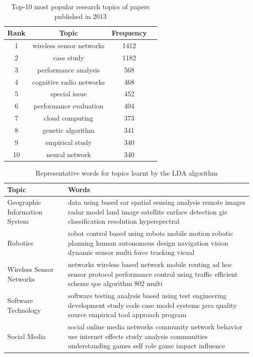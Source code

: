 \documentclass{sig-alternate-05-2015}
\begin{document}
\begin{table}[th]
\centering
\caption{Top-10 most popular research topics of papers published in 2013} \label{tbl:poptop}
\begin{tabular}{cccc}
\hline
Rank & Topic & Frequency\\ 
\hline
1 & wireless sensor networks & 1412 \\
2 & case study & 1182 \\
3 & performance analysis & 568 \\
4 & cognitive radio networks & 468 \\
5 & special issue & 452 \\
6 & performance evaluation & 404 \\
7 & cloud computing & 373 \\
8 & genetic algorithm & 341 \\
9 & empirical study & 340 \\
10 & neural network & 340 \\
\hline
\end{tabular}
\end{table}

\begin{table}[th]\small
\centering
\caption{Representative words for topics learnt by the LDA algorithm} \label{tbl:topics}
\begin{tabular}{p{65pt}p{180pt}}
\hline
Topic & Words\\
\hline
Geographic Information System & data using based sar spatial sensing analysis remote images radar model land image satellite surface detection gis classification resolution hyperspectral \\ 
Robotics & robot control based using robots mobile motion robotic planning human autonomous design navigation vision dynamic sensor multi force tracking visual \\
Wireless Sensor Networks & networks wireless based network mobile routing ad hoc sensor protocol performance control using traffic efficient scheme qos algorithm 802 multi \\
Software Technology & software testing analysis based using test engineering development study code case model systems java quality source empirical tool approach program \\
Social Media & social online media networks community network behavior use internet effects study analysis communities understanding games self role game impact influence \\
\hline
\end{tabular}
\end{table}
\end{document}
